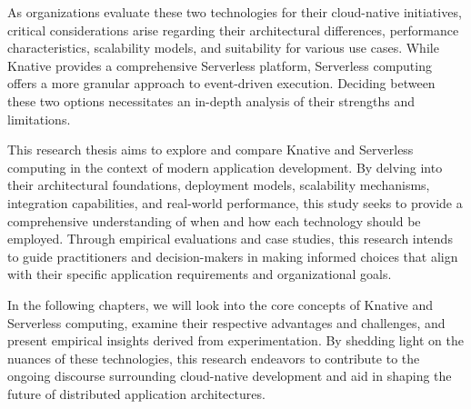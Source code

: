 \documentclass{article}
\begin{document}
As organizations evaluate these two technologies for their cloud-native initiatives, critical considerations arise regarding their architectural differences, performance characteristics, scalability models, and suitability for various use cases. While Knative provides a comprehensive Serverless platform, Serverless computing offers a more granular approach to event-driven execution. Deciding between these two options necessitates an in-depth analysis of their strengths and limitations.

This research thesis aims to explore and compare Knative and Serverless computing in the context of modern application development. By delving into their architectural foundations, deployment models, scalability mechanisms, integration capabilities, and real-world performance, this study seeks to provide a comprehensive understanding of when and how each technology should be employed. Through empirical evaluations and case studies, this research intends to guide practitioners and decision-makers in making informed choices that align with their specific application requirements and organizational goals.

In the following chapters, we will look into the core concepts of Knative and Serverless computing, examine their respective advantages and challenges, and present empirical insights derived from experimentation. By shedding light on the nuances of these technologies, this research endeavors to contribute to the ongoing discourse surrounding cloud-native development and aid in shaping the future of distributed application architectures.
\pagebreak
\end{document}
